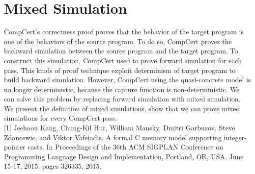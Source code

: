 \documentclass[nocopyrightspace]{sigplanconf}
\begin{document}
\section{Mixed Simulation}
CompCert's correctness proof proves that the behavior of the target program is one of the behaviors of the source program. 
To do so, CompCert proves the backward simulation between the source program and the target program. 
To construct this simulation, CompCert used to prove forward simulation for each pass. This kinds of proof technique exploit determinism of target program to build backward simulation. However, CompCert using the quasi-concrete model is no longer deterministic, because the capture function is non-deterministic. We can solve this problem by replacing forward simulation with mixed simulation. We present the definition of mixed simulations, show that we can prove mixed simulations for every CompCert pass. \\





 [1] Jeehoon Kang, Chung-Kil Hur, William Mansky, Dmitri Garbuzov, Steve Zdancewic, and Viktor Vafeiadis. A formal C memory model supporting integer-pointer casts. In Proceedings of the 36th ACM SIGPLAN Conference on Programming Language Design and Implementation, Portland, OR, USA, June 15-17, 2015, pages 326335, 2015.
\end{document}

